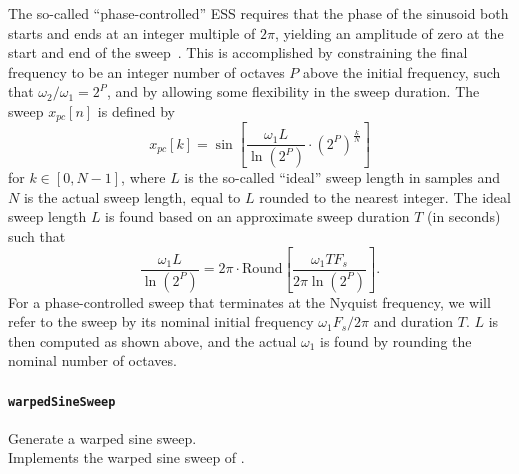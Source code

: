 \documentclass[11pt, oneside]{article}
\newcommand{\function}[1]{\paragraph*{\texttt{#1}}}
\begin{document}
The so-called ``phase-controlled'' ESS requires that the phase of the sinusoid both starts and ends at an integer multiple of $2 \pi$, yielding an amplitude of zero at the start and end of the sweep~\cite{VetterdiRosario2011}. This is accomplished by constraining the final frequency to be an integer number of octaves $P$ above the initial frequency, such that $\omega_2/\omega_1=2^P$, and by allowing some flexibility in the sweep duration. The sweep $x_{pc}[n]$ is defined by~\cite{VetterdiRosario2011}
\begin{equation}
x_{pc}[k] = \sin \left[ \frac{ \omega_1 L}{\ln \left( 2^P \right)} \cdot \left( 2^P \right)^{\frac{k}{N}} \right]
\end{equation}
for $k \in[0,N-1]$, where $L$ is the so-called ``ideal'' sweep length in samples and $N$ is the actual sweep length, equal to $L$ rounded to the nearest integer. The ideal sweep length $L$ is found based on an approximate sweep duration $T$ (in seconds) such that 
\begin{equation}
\frac{\omega_1 L}{\ln \left( 2^P \right)} = 2 \pi \cdot \textrm{Round} \left[ \frac{\omega_1 T F_s}{2 \pi \ln \left( 2^P \right)} \right].
\end{equation}
For a phase-controlled sweep that terminates at the Nyquist frequency, we will refer to the sweep by its nominal initial frequency $\omega_1 F_s/2 \pi$ and duration $T$. $L$ is then computed as shown above, and the actual $\omega_1$ is found by rounding the nominal number of octaves.

\function{warpedSineSweep} Generate a warped sine sweep. \\
Implements the warped sine sweep of \citet{OchiaiKaneda2013}.



\end{document}
